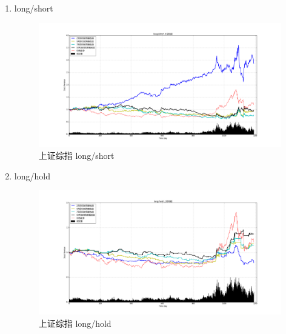 \documentclass[12pt,a4paper]{article}
\begin{document}
\begin{enumerate}
\item long/short 
\begin{figure}[H]
	\centering
	\includegraphics[width=1.0\textwidth]{img_r_2/szzz.png}
	\caption{上证综指 long/short}
\end{figure}
\item long/hold 
\begin{figure}[H]
	\centering
	\includegraphics[width=1.0\textwidth]{img_r_2/szzz_1.png}
	\caption{上证综指 long/hold}
\end{figure}
\end{enumerate}
\end{document}
